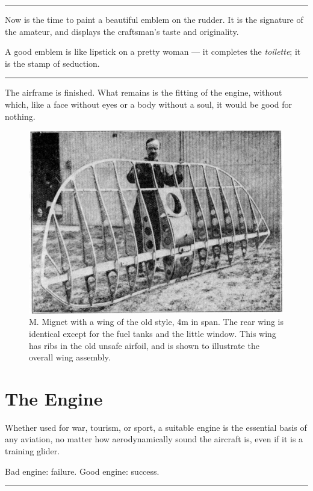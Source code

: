 \documentclass{book}
\newcommand*\sectline{
  \vspace{5pt}
  \begin{center}
    \rule{0.5\linewidth}{\linethickness}
  \end{center}
  \vspace{5pt}
}
\begin{document}
\sectline

Now is the time to paint a beautiful emblem on the rudder.  It is the
signature of the amateur, and displays the craftsman's taste and
originality.

A good emblem is like lipstick on a pretty woman --- it completes the
\textit{toilette}; it is the stamp of seduction.

\sectline

The airframe is finished.  What remains is the fitting of the engine,
without which, like a face without eyes or a body without a soul, it
would be good for nothing.

\begin{figure}
  \includegraphics[width=\linewidth]{fig-50.jpg}
  \caption{M. Mignet with a wing of the old style, 4m in span.  The
    rear wing is identical except for the fuel tanks and the little
    window.  This wing has ribs in the old unsafe airfoil, and is
    shown to illustrate the overall wing assembly.}
  \label{fig:fifty}
\end{figure}


\chapter{The Engine}

Whether used for war, tourism, or sport, a suitable engine is the
essential basis of any aviation, no matter how aerodynamically sound
the aircraft is, even if it is a training glider.

Bad engine: failure.  Good engine: success.

\sectline
\end{document}
